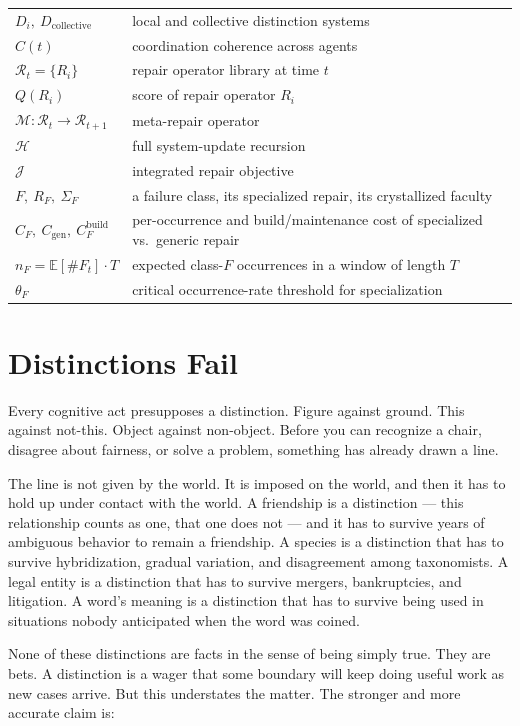 \documentclass[11pt]{article}
\theoremstyle{plain}
\theoremstyle{definition}
\theoremstyle{remark}
\begin{document}
\begin{center}
\begin{tabular}{lp{10.3cm}}
$D_i,\ D_{\mathrm{collective}}$ & local and collective distinction systems \\
$C(t)$ & coordination coherence across agents \\
$\mathcal{R}_t = \{R_i\}$ & repair operator library at time $t$ \\
$Q(R_i)$ & score of repair operator $R_i$ \\
$\mathcal{M} : \mathcal{R}_t \to \mathcal{R}_{t+1}$ & meta-repair operator \\
$\mathcal{H}$ & full system-update recursion \\
$\mathcal{J}$ & integrated repair objective \\
\midrule
$F,\ R_F,\ \Sigma_F$ & a failure class, its specialized repair, its crystallized faculty \\
$C_F,\ C_{\mathrm{gen}},\ C_F^{\mathrm{build}}$ & per-occurrence and build/maintenance cost of specialized vs.\ generic repair \\
$n_F = \mathbb{E}[\#F_t]\cdot T$ & expected class-$F$ occurrences in a window of length $T$ \\
$\theta_F$ & critical occurrence-rate threshold for specialization \\
\end{tabular}
\end{center}

\section{Distinctions Fail}

Every cognitive act presupposes a distinction. Figure against ground. This against not-this. Object against non-object. Before you can recognize a chair, disagree about fairness, or solve a problem, something has already drawn a line.

The line is not given by the world. It is imposed on the world, and then it has to hold up under contact with the world. A friendship is a distinction --- this relationship counts as one, that one does not --- and it has to survive years of ambiguous behavior to remain a friendship. A species is a distinction that has to survive hybridization, gradual variation, and disagreement among taxonomists. A legal entity is a distinction that has to survive mergers, bankruptcies, and litigation. A word's meaning is a distinction that has to survive being used in situations nobody anticipated when the word was coined.

None of these distinctions are facts in the sense of being simply true. They are bets. A distinction is a wager that some boundary will keep doing useful work as new cases arrive. But this understates the matter. The stronger and more accurate claim is:
\end{document}

